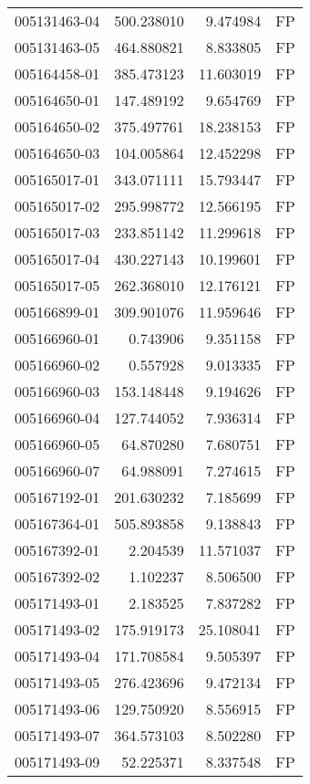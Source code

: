 \begin{tabular}{lrrl}
005131463-04 &  500.238010 &     9.474984 &   FP \\
005131463-05 &  464.880821 &     8.833805 &   FP \\
005164458-01 &  385.473123 &    11.603019 &   FP \\
005164650-01 &  147.489192 &     9.654769 &   FP \\
005164650-02 &  375.497761 &    18.238153 &   FP \\
005164650-03 &  104.005864 &    12.452298 &   FP \\
005165017-01 &  343.071111 &    15.793447 &   FP \\
005165017-02 &  295.998772 &    12.566195 &   FP \\
005165017-03 &  233.851142 &    11.299618 &   FP \\
005165017-04 &  430.227143 &    10.199601 &   FP \\
005165017-05 &  262.368010 &    12.176121 &   FP \\
005166899-01 &  309.901076 &    11.959646 &   FP \\
005166960-01 &    0.743906 &     9.351158 &   FP \\
005166960-02 &    0.557928 &     9.013335 &   FP \\
005166960-03 &  153.148448 &     9.194626 &   FP \\
005166960-04 &  127.744052 &     7.936314 &   FP \\
005166960-05 &   64.870280 &     7.680751 &   FP \\
005166960-07 &   64.988091 &     7.274615 &   FP \\
005167192-01 &  201.630232 &     7.185699 &   FP \\
005167364-01 &  505.893858 &     9.138843 &   FP \\
005167392-01 &    2.204539 &    11.571037 &   FP \\
005167392-02 &    1.102237 &     8.506500 &   FP \\
005171493-01 &    2.183525 &     7.837282 &   FP \\
005171493-02 &  175.919173 &    25.108041 &   FP \\
005171493-04 &  171.708584 &     9.505397 &   FP \\
005171493-05 &  276.423696 &     9.472134 &   FP \\
005171493-06 &  129.750920 &     8.556915 &   FP \\
005171493-07 &  364.573103 &     8.502280 &   FP \\
005171493-09 &   52.225371 &     8.337548 &   FP \\

\end{tabular}
